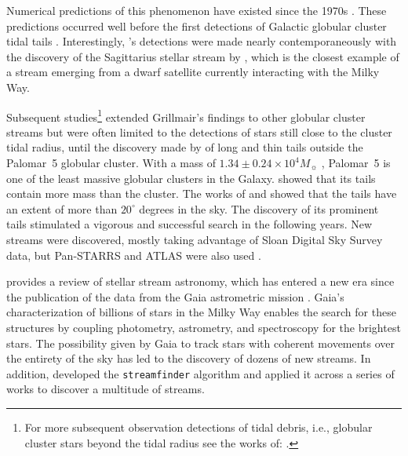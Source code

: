 \documentclass{aa}
\begin{document}
  Numerical predictions of this phenomenon have existed since the 1970s \citep[see, e.g.,][]{1975AJ.....80..290K}. These predictions occurred well before the first detections of Galactic globular cluster tidal tails \citep{1995AJ....109.2553G}. Interestingly, \citet{1995AJ....109.2553G}'s detections were made nearly contemporaneously with the discovery of the Sagittarius stellar stream by \citet{1994Natur.370..194I}, which is the closest example of a stream emerging from a dwarf satellite currently interacting with the Milky Way. 
  
  Subsequent studies\footnote{For more subsequent observation detections of tidal debris, i.e., globular cluster stars beyond the tidal radius see the works of: \citet{1997A&A...320..776L, 2000A&A...356..127T, 2000A&A...359..907L, 2001AAS...19910906S, 2003AJ....126..815L,2011ApJ...726...47S,2018MNRAS.476.4814S,2020MNRAS.495.2222S}.} extended Grillmair's findings to other globular cluster streams but were often limited to the detections of stars still close to the cluster tidal radius, until the discovery made by \citet{2001ApJ...548L.165O,2002AAS...200.1001O, 2003AJ....126.2385O} of long and thin tails outside the Palomar~5 globular cluster. With a mass of $1.34\pm 0.24 \times 10^4 M_{\sun}$ \citep{2019MNRAS.482.5138B}, Palomar~5 is one of the least massive globular clusters in the Galaxy. \citet{2003AJ....126.2385O} showed that its tails contain more mass than the cluster. The works of \citet{2006ApJ...641L..37G} and \citet{2015MNRAS.446.3297K} showed that the tails have an extent of more than $20^\circ$ degrees in the sky. The discovery of its prominent tails stimulated a vigorous and successful search in the following years. New streams were discovered, mostly taking advantage of Sloan Digital Sky Survey data, but Pan-STARRS and ATLAS were also used \citep{2006ApJ...643L..17G, 2006ApJ...637L..29B, 2009ApJ...693.1118G, 2012ApJ...760L...6B, 2013ApJ...769L..23G, 2014ApJ...790L..10G, 2015ApJ...812L..26G, 2014MNRAS.443L..84B, 2016MNRAS.463.1759B, 2017ApJ...847..119G, 2014MNRAS.442L..85K}. 
  
  
  \citet{2025NewAR.10001713B} provides a review of stellar stream astronomy, which has entered a new era since the publication of the data from the Gaia astrometric mission \citep{2016A&A...595A...1G}. Gaia's characterization of billions of stars in the Milky Way enables the search for these structures by coupling photometry, astrometry, and spectroscopy for the brightest stars. The possibility given by Gaia to track stars with coherent movements over the entirety of the sky has led to the discovery of dozens of new streams. In addition, \citet{2018MNRAS.477.4063M} developed the \texttt{streamfinder} algorithm and applied it across a series of works \citep{2018MNRAS.481.3442M,  2018ApJ...865...85I, 2019ApJ...872..152I} to discover a multitude of streams.
  
\end{document}
